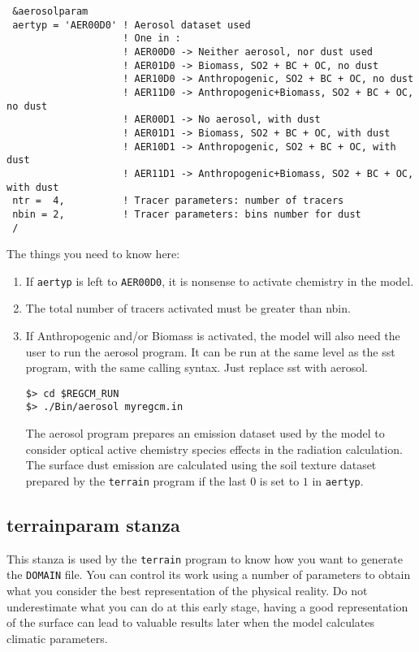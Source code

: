 {\footnotesize
\begin{Verbatim}
 &aerosolparam
 aertyp = 'AER00D0' ! Aerosol dataset used
                    ! One in :
                    ! AER00D0 -> Neither aerosol, nor dust used
                    ! AER01D0 -> Biomass, SO2 + BC + OC, no dust
                    ! AER10D0 -> Anthropogenic, SO2 + BC + OC, no dust
                    ! AER11D0 -> Anthropogenic+Biomass, SO2 + BC + OC, no dust
                    ! AER00D1 -> No aerosol, with dust
                    ! AER01D1 -> Biomass, SO2 + BC + OC, with dust
                    ! AER10D1 -> Anthropogenic, SO2 + BC + OC, with dust
                    ! AER11D1 -> Anthropogenic+Biomass, SO2 + BC + OC, with dust
 ntr =  4,          ! Tracer parameters: number of tracers
 nbin = 2,          ! Tracer parameters: bins number for dust
 /
\end{Verbatim}
}

The things you need to know here:

\begin{enumerate}
\item If \verb=aertyp= is left to \verb=AER00D0=, it is nonsense to activate
chemistry in the model.
\item The total number of tracers activated must be greater than nbin.
\item If Anthropogenic and/or Biomass is activated, the model will also need
the user to run the aerosol program. It can be run at the same level as the
sst program, with the same calling syntax. Just replace sst with aerosol.
\begin{Verbatim}
$> cd $REGCM_RUN
$> ./Bin/aerosol myregcm.in
\end{Verbatim}
The aerosol program prepares an emission dataset used by the model
to consider optical active chemistry species effects in the radiation
calculation. The surface dust emission are calculated using the soil
texture dataset prepared by the \verb=terrain= program if the last
$0$ is set to $1$ in \verb=aertyp=.
\end{enumerate}

\subsection{terrainparam stanza}
\label{terparam}
This stanza is used by the \verb=terrain= program to know how you want
to generate the \verb=DOMAIN= file. You can control its work using a number of
parameters to obtain what you consider the best representation of the
physical reality. Do not underestimate what you can do at this early stage,
having a good representation of the surface can lead to valuable results
later when the model calculates climatic parameters.

